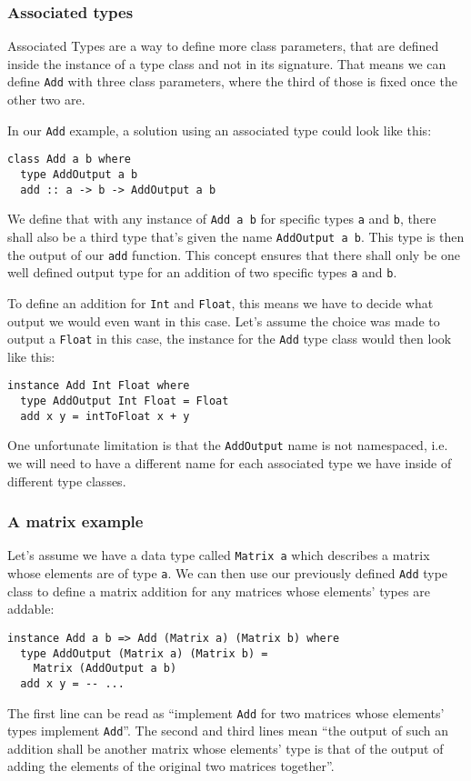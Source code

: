 
\subsubsection{Associated types}


Associated Types are a way to define more class parameters, that are defined inside the instance of a type class and not in its signature. That means we can define \verb|Add| with three class parameters, where the third of those is fixed once the other two are.

In our \verb|Add| example, a solution using an associated type could look like this:
\begin{verbatim}
class Add a b where
  type AddOutput a b
  add :: a -> b -> AddOutput a b
\end{verbatim}
We define that with any instance of \verb|Add a b| for specific types \verb|a| and \verb|b|, there shall also be a third type that's given the name \verb|AddOutput a b|. This type is then the output of our \verb|add| function. This concept ensures that there shall only be one well defined output type for an addition of two specific types \verb|a| and \verb|b|.

To define an addition for \verb|Int| and \verb|Float|, this means we have to decide what output we would even want in this case. Let's assume the choice was made to output a \verb|Float| in this case, the instance for the \verb|Add| type class would then look like this:
\begin{verbatim}
instance Add Int Float where
  type AddOutput Int Float = Float
  add x y = intToFloat x + y
\end{verbatim}
One unfortunate limitation is that the \verb|AddOutput| name is not namespaced, i.e. we will need to have a different name for each associated type we have inside of different type classes.

\subsubsection{A matrix example}\label{haskell-matrix}

Let's assume we have a data type called \verb|Matrix a| which describes a matrix whose elements are of type \verb|a|. We can then use our previously defined \verb|Add| type class to define a matrix addition for any matrices whose elements' types are addable:
\begin{verbatim}
instance Add a b => Add (Matrix a) (Matrix b) where
  type AddOutput (Matrix a) (Matrix b) =
    Matrix (AddOutput a b)
  add x y = -- ...
\end{verbatim}
The first line can be read as ``implement \verb|Add| for two matrices whose elements' types implement \verb|Add|''. The second and third lines mean ``the output of such an addition shall be another matrix whose elements' type is that of the output of adding the elements of the original two matrices together''.

